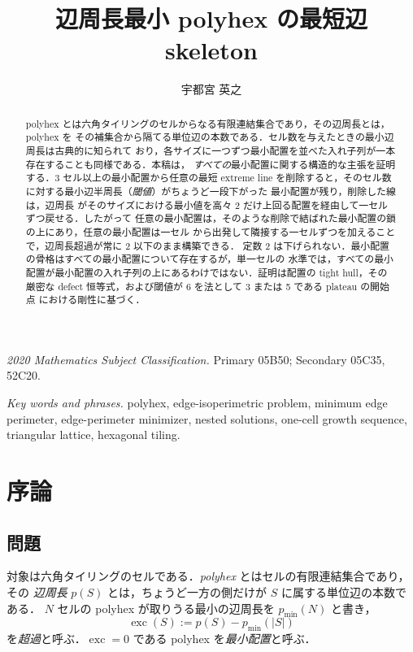 \documentclass[11pt]{article}
\title{辺周長最小 polyhex の最短辺 skeleton}
\author{宇都宮 英之}
\date{}
\theoremstyle{plain}
\theoremstyle{definition}
\theoremstyle{remark}
\DeclareMathOperator{\exc}{exc}
\begin{document}
\maketitle

\begin{abstract}
polyhex とは六角タイリングのセルからなる有限連結集合であり，その辺周長とは，polyhex を
その補集合から隔てる単位辺の本数である．セル数を与えたときの最小辺周長は古典的に知られて
おり，各サイズに一つずつ最小配置を並べた入れ子列が一本存在することも同様である．本稿は，
\emph{すべての}最小配置に関する構造的な主張を証明する．3 セル以上の最小配置から任意の最短
extreme line を削除すると，そのセル数に対する最小辺半周長（\emph{閾値}）がちょうど一段下がった
最小配置が残り，削除した線は，辺周長
がそのサイズにおける最小値を高々 2 だけ上回る配置を経由して一セルずつ戻せる．したがって
任意の最小配置は，そのような削除で結ばれた最小配置の鎖の上にあり，任意の最小配置は一セル
から出発して隣接する一セルずつを加えることで，辺周長超過が常に 2 以下のまま構築できる．
定数 2 は下げられない．最小配置の骨格はすべての最小配置について存在するが，単一セルの
水準では，すべての最小配置が最小配置の入れ子列の上にあるわけではない．証明は配置の tight
hull，その厳密な defect 恒等式，および閾値が 6 を法として 3 または 5 である plateau の開始点
における剛性に基づく．
\end{abstract}

\noindent\textit{2020 Mathematics Subject Classification.} Primary 05B50; Secondary 05C35,
52C20.

\noindent\textit{Key words and phrases.} polyhex, edge-isoperimetric problem, minimum edge
perimeter, edge-perimeter minimizer, nested solutions, one-cell growth sequence, triangular
lattice, hexagonal tiling.

\section{序論}\label{sec:intro}

\subsection{問題}\label{sec:0.1}

対象は六角タイリングのセルである．\emph{polyhex} とはセルの有限連結集合であり，その
\emph{辺周長} \(p(S)\) とは，ちょうど一方の側だけが \(S\) に属する単位辺の本数である．
\(N\) セルの polyhex が取りうる最小の辺周長を \(p_{\min}(N)\) と書き，
\[
   \exc(S):=p(S)-p_{\min}(|S|)
\]
を\emph{超過}と呼ぶ．\(\exc=0\) である polyhex を\emph{最小配置}と呼ぶ．
\end{document}
